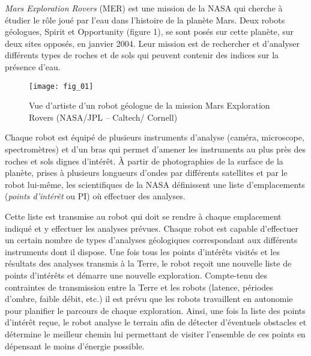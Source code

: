 \textit{Mars Exploration Rovers} (MER) est une mission de la NASA qui cherche à étudier le rôle joué par l’eau dans
l’histoire de la planète Mars. Deux robots géologues, Spirit et Opportunity (figure 1), se sont posés sur cette
planète, sur deux sites opposés, en janvier 2004. Leur mission est de rechercher et d’analyser différents types de
roches et de sols qui peuvent contenir des indices sur la présence d’eau. 

\begin{figure}[H]
\centering
\texttt{[image: fig\_01]}
\caption{Vue d’artiste d’un robot géologue de la mission Mars Exploration Rovers (NASA/JPL – Caltech/
Cornell) \label{fig_01}}
\end{figure}



Chaque robot est équipé de plusieurs instruments d’analyse (caméra, microscope, spectromètres) et d’un bras
qui permet d’amener les instruments au plus près des roches et sols dignes d’intérêt. À partir de photographies de
la surface de la planète, prises à plusieurs longueurs d’ondes par différents satellites et par le robot lui-même, les
scientifiques de la NASA définissent une liste d’emplacements (\textit{points d’intérêt} ou PI) où effectuer des analyses.

Cette liste est transmise au robot qui doit se rendre à chaque emplacement indiqué et y effectuer les analyses
prévues. Chaque robot est capable d’effectuer un certain nombre de types d’analyses géologiques correspondant
aux différents instruments dont il dispose. Une fois tous les points d’intérêts visités et les résultats des analyses
transmis à la Terre, le robot reçoit une nouvelle liste de points d’intérêts et démarre une nouvelle exploration.
Compte-tenu des contraintes de transmission entre la Terre et les robots (latence, périodes d’ombre, faible débit,
etc.) il est prévu que les robots travaillent en autonomie pour planifier le parcours de chaque exploration. Ainsi,
une fois la liste des points d’intérêt reçue, le robot analyse le terrain afin de détecter d’éventuels obstacles et
détermine le meilleur chemin lui permettant de visiter l’ensemble de ces points en dépensant le moins d’énergie
possible.

